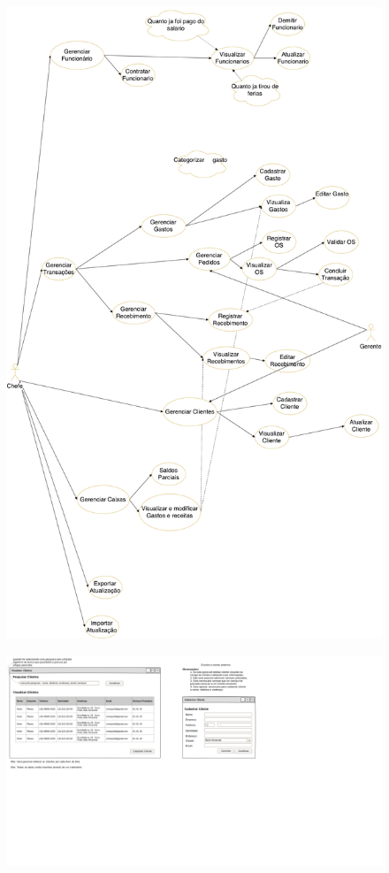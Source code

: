 \documentclass[a4paper,12pt]{article}
\begin{document}
		\begin{figure}[H]
			\centering \includegraphics[width=\textwidth]{./DiagramaCasoDeUsoOficinaOld.pdf} 
		\end{figure}
		\begin{figure}[H]
			\centering \includegraphics[width=\textwidth]{./Gerenciar Cliente.png}
		\end{figure}
\end{document}
